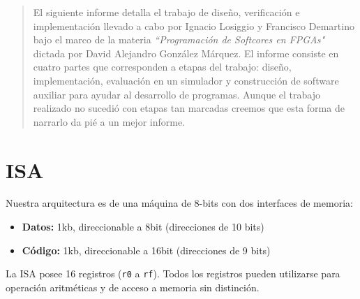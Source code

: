 \documentclass{article}
\begin{document}

\fecha{\today}



\maketitle

\begin{abstract}
El siguiente informe detalla el trabajo de diseño, verificación e implementación llevado a cabo por Ignacio Losiggio y Francisco Demartino bajo el marco de la materia \emph{``Programación de Softcores en FPGAs"} dictada por David Alejandro González Márquez. El informe consiste en cuatro partes que corresponden a etapas del trabajo: diseño, implementación, evaluación en un simulador y construcción de software auxiliar para ayudar al desarrollo de programas. Aunque el trabajo realizado no sucedió con etapas tan marcadas creemos que esta forma de narrarlo da pié a un mejor informe.
\end{abstract}

\tableofcontents

\newpage

\section{ISA}

Nuestra arquitectura es de una máquina de 8-bits con dos interfaces de memoria:
\begin{itemize}
    \item \textbf{Datos:}  1kb, direccionable a 8bit (direcciones de 10 bits)
    \item \textbf{Código:} 1kb, direccionable a 16bit (direcciones de 9 bits)
\end{itemize}

La ISA posee 16 registros (\texttt{r0} a \texttt{rf}). Todos los registros pueden utilizarse para operación aritméticas y de acceso a memoria sin distinción.
\end{document}
